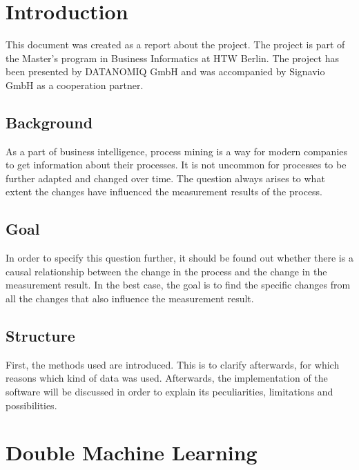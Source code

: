 \chapter{Introduction}
    This document was created as a report about the project. The project is part of the Master's program in Business Informatics at HTW Berlin. The project has been presented by DATANOMIQ GmbH and was accompanied by Signavio GmbH as a cooperation partner.

    \section{Background}
    As a part of business intelligence, process mining is a way for modern companies to get information about their processes. It is not uncommon for processes to be further adapted and changed over time. The question always arises to what extent the changes have influenced the measurement results of the process.

    \section{Goal}
    In order to specify this question further, it should be found out whether there is a causal relationship between the change in the process and the change in the measurement result. In the best case, the goal is to find the specific changes from all the changes that also influence the measurement result.

    \section{Structure}
    First, the methods used are introduced. This is to clarify afterwards, for which reasons which kind of data was used. Afterwards, the implementation of the software will be discussed in order to explain its peculiarities, limitations and possibilities.

\clearpage
\chapter{Double Machine Learning}

